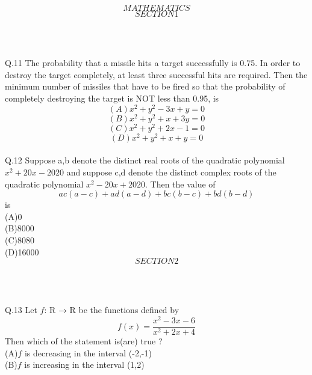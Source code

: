 \documentclass[11pt]{article}
\begin{document}
                     $$MATHEMATICS$$
                      $$SECTION1$$\\
\begin{center}
 \\
\end{center}
Q.11 The probability that a missile hits a target successfully is 0.75. In order to destroy the target completely, at least three successful hits are required. Then the minimum number of missiles that have to be fired so that the probability of completely destroying the target is NOT less than 0.95, is 
\begin{equation}
(A)x^2+y^2-3x+y=0
\end{equation}
\begin{equation}
(B)x^2+y^2+x+3y=0
\end{equation}
\begin{equation}
(C)x^2+y^2+2x-1=0
\end{equation}
\begin{equation}
(D)x^2+y^2+x+y=0
\end{equation}\\
Q.12 Suppose a,b denote the distinct real roots of the quadratic polynomial $x^2+20x-2020$ and suppose c,d denote the distinct complex roots of the quadratic polynomial $x^2-20x+2020$. Then the value of
$$ac(a-c)+ad(a-d)+bc(b-c)+bd(b-d)$$ is\\
(A)0\\
(B)8000\\
(C)8080\\
(D)16000\\
                      $$SECTION2$$\\ 
\begin{center}
 \\
\end{center}                 
Q.13 Let $f$: R → R  be the functions defined by
$$f(x)=\frac{x^2-3x-6}{x^2+2x+4}$$
Then which of the statement is(are) true ?\\
(A)$f$ is decreasing in the interval (-2,-1)\\
(B)$f$ is increasing in the interval (1,2)\\
\end{document}
